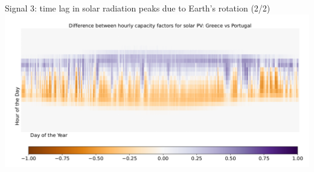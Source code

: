 \begin{frame}{Signal 3: time lag in solar radiation peaks due to Earth's rotation (2/2)}
  \centering
  \vspace{0.3cm}
  \includegraphics[width=14cm]{images/results-8.png}
\end{frame}


